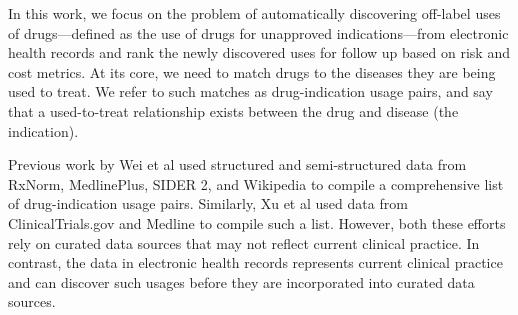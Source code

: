 In this work, we focus on the problem of automatically discovering
off-label uses of drugs—defined as the use of drugs for unapproved
indications—from electronic health records and rank the newly
discovered uses for follow up based on risk and cost metrics.  At its
core, we need to match drugs to the diseases they are being used to
treat.  We refer to such matches as drug-indication usage pairs, and
say that a used-to-treat relationship exists between the drug and
disease (the indication).

Previous work by Wei et al \cite{WeiQi2013} used structured and
semi-structured data from RxNorm, MedlinePlus, SIDER 2, and Wikipedia
to compile a comprehensive list of drug-indication usage pairs.
Similarly, Xu et al \cite{Xu2013} used data from ClinicalTrials.gov
and Medline to compile such a list.  However, both these efforts rely
on curated data sources that may not reflect current clinical
practice.  In contrast, the data in electronic health records
represents current clinical practice and can discover such usages
before they are incorporated into curated data sources.

